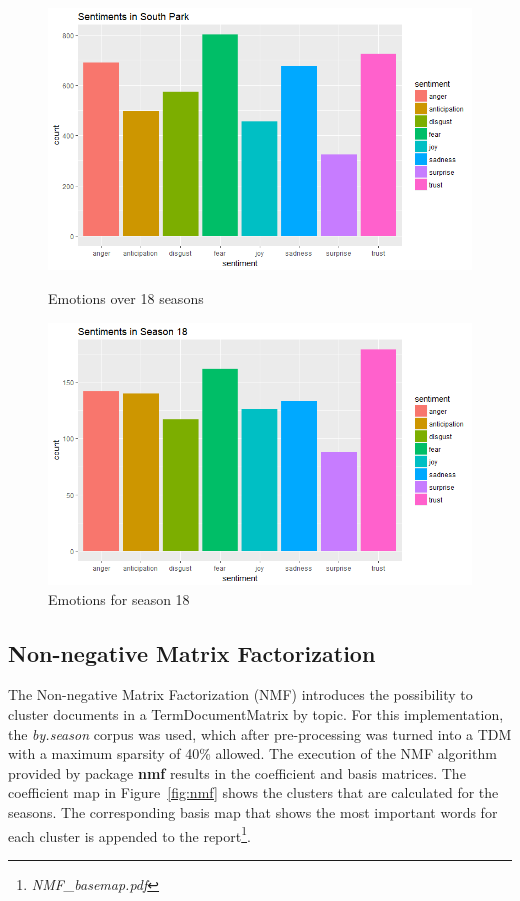 \documentclass[10pt,a4paper]{article}
\begin{document}
	
	\begin{figure}[!h]
  \centering
  \begin{minipage}[b]{0.45\textwidth}
    \includegraphics[width=\textwidth]{images/SentimentsSouthPark.png}
    \caption{Emotions over 18 seasons}
	\label{fig:EmotionAll}
  \end{minipage}
  \hfill
  \begin{minipage}[b]{0.45\textwidth}
    \includegraphics[width=\textwidth]{images/SentimentsSeason18.png}
    \caption{Emotions for season 18}
	\label{fig:Emotion18}
  \end{minipage}
\end{figure}		
	
				
	\FloatBarrier
	\subsection{Non-negative Matrix Factorization}
	The Non-negative Matrix Factorization (NMF) introduces the possibility to cluster documents in a TermDocumentMatrix by topic. For this implementation, the \textit{by.season} corpus was used, which after pre-processing was turned into a TDM with a maximum sparsity of 40\% allowed. The execution of the NMF algorithm provided by package \textbf{nmf} results in the coefficient and basis matrices. The coefficient map in Figure~\ref{fig:nmf} shows the clusters that are calculated for the seasons. The corresponding basis map that shows the most important words for each cluster is appended to the report\footnote{\textit{NMF\_basemap.pdf}}.
	
\end{document}
